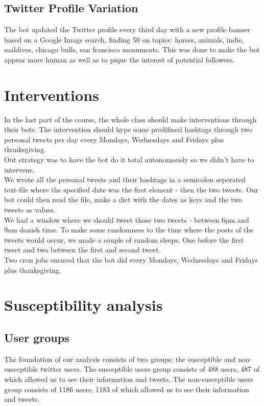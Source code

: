 \documentclass[10pt]{IEEEtran}
\begin{document}
\subsection{Twitter Profile Variation}
The bot updated the Twitter profile every third day with a new profile banner based on a Google Image search, finding 50 on topics: horses, animals, indie, maldives, chicago bulls, san francisco monuments. This was done to make the bot appear more human as well as to pique the interest of potential followers.

\section{Interventions}
In the last part of the course, the whole class should make interventions through their bots. The intervention should hype some predifined hashtags through two personal tweets per day every Mondays, Wednesdays and Fridays plus thanksgiving. \\
Out strategy was to have the bot do it total autonomously so we didn't have to intervene. \\

We wrote all the personal tweets and their hashtags in a semicolon seperated text-file where the specified date was the first element - then the two tweets. Our bot could then read the file, make a dict with the dates as keys and the two tweets as values. \\

We had a window where we should tweet those two tweets - between 6pm and 9am danish time. To make some randomness to the time where the posts of the tweets would occur, we made a couple of random sleeps. One before the first tweet and two between the first and second tweet. \\
Two cron jobs ensured that the bot did every Mondays, Wednesdays and Fridays plus thanksgiving.

\section{Susceptibility analysis}
\subsection{User groups}
The foundation of our analysis consists of two groups: the susceptible and non-susceptible twitter users. The susceptible users group consists of 488 users, 487 of which allowed us to see their information and tweets. The non-susceptible users group consists of 1186 users, 1183 of which allowed us to see their information and tweets.
\end{document}
